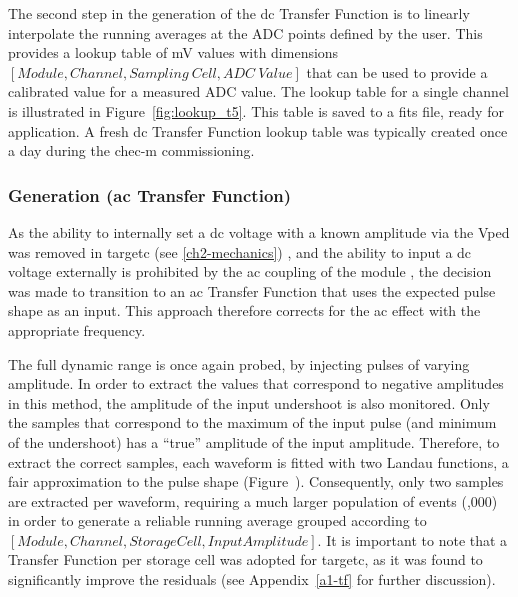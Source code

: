 The second step in the generation of the \gls{dc} Transfer Function is to linearly interpolate the running averages at the ADC points defined by the user. This provides a lookup table of \si{mV} values with dimensions $[Module, Channel, Sampling~Cell, ADC~Value]$ that can be used to provide a calibrated value for a measured ADC value. The lookup table for a single channel is illustrated in Figure~\ref{fig:lookup_t5}. This table is saved to a \gls{fits} file, ready for application. A fresh \gls{dc} Transfer Function lookup table was typically created once a day during the \gls{chec-m} commissioning.

\subsubsection{Generation (\gls{ac} Transfer Function)}


As the ability to internally set a \gls{dc} voltage with a known amplitude via the Vped was removed in \gls{targetc} (see \ref{ch2-mechanics}) , and the ability to input a \gls{dc} voltage externally is prohibited by the \gls{ac} coupling of the module , the decision was made to transition to an \gls{ac} Transfer Function that uses the expected pulse shape as an input. This approach therefore corrects for the \gls{ac} effect with the appropriate frequency. 
	
The full dynamic range is once again probed, by injecting pulses of varying amplitude. In order to extract the values that correspond to negative amplitudes in this method, the amplitude of the input undershoot is also monitored. Only the samples that correspond to the maximum of the input pulse (and minimum of the undershoot) has a ``true'' amplitude of the input amplitude. Therefore, to extract the correct samples, each waveform is fitted with two Landau functions, a fair approximation to the pulse shape (Figure~). Consequently, only two samples are extracted per waveform, requiring a much larger population of events (,000) in order to generate a reliable running average grouped according to $[Module, Channel, Storage Cell, Input Amplitude]$. It is important to note that a Transfer Function per storage cell was adopted for \gls{targetc}, as it was found to significantly improve the residuals (see Appendix~\ref{a1-tf} for further discussion).

